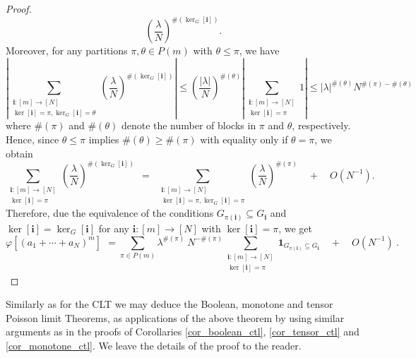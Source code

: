 \documentclass[a4paper,12pt]{extarticle}
\theoremstyle{definition}
\theoremstyle{remark}
\newcommand{\abs}[1]{\left\vert {#1} \right\vert}
\begin{document}
\begin{proof}
\[	\left(\frac{\lambda}{N}\right)^{\# (\ker_G[\bm{i}])} .
	\]
	Moreover, for any partitions $\pi, \theta \in P(m)$ with $\theta \leq \pi$, we have
	\[
	\abs{
		\sum_{\substack{ {\bm i}:[m]\rightarrow [N] \\ \ker[\bm{i}]=\pi, \ker_G[\bm{i}] = \theta}} 
		\left(\frac{\lambda}{N}\right)^{\# (\ker_G[\bm{i}])}}
	\leq 
	\left(
	\frac{ \abs{\lambda} }{N} \right)^{\#(\theta) }
	\abs{
		\sum_{\substack{ {\bm i}:[m]\rightarrow [N] \\ \ker[\bm{i}]=\pi }} 
		1 
	}
	\leq 
	\abs{\lambda}^{\#(\theta)}  N^{\#(\pi) - \#(\theta)}
	\]
	where $\#(\pi)$ and $\#(\theta)$ denote the number of blocks in $\pi$ and $\theta$, respectively. 
	Hence, since $\theta \leq \pi$ implies $\#(\theta) \geq \#(\pi)$ with equality only if $\theta = \pi$, we obtain 
	\[
	\sum_{\substack{ {\bm i}:[m]\rightarrow [N] \\ \ker[{\bm i}]=\pi}}  
	\left(\frac{\lambda}{N}\right)^{\# (\ker_G[\bm{i}])}
	\ \ = \ \ 
	\sum_{\substack{ {\bm i}:[m]\rightarrow [N] \\ \ker[\bm{i}]=\pi, \ker_G[\bm{i}] = \pi}} 
	\left(\frac{\lambda}{N}\right)^{\# (\pi)} 
	\quad + \quad O(N^{-1}) .
	\]
	Therefore, due the equivalence of the conditions $G_{\pi(\bm{i})}  \subseteq G_{\bm i}$ and $\ker[\bm{i}]= \ker_G[\bm{i}] $ for any ${\bm i}:[m]\rightarrow [N]$ with $\ker[{\bm i}]=\pi$, we get 
	\[ \varphi\left[ \left( a_1+\cdots+a_N  \right)_{}^m\right]
	\ \, =
	\sum_{\pi \in P(m)}  
	\lambda^{\#(\pi)}  \ N^{-\#(\pi)}
	\sum_{\substack{ {\bm i}:[m]\rightarrow [N] \\ \ker[{\bm i}]=\pi}}  
	\bm{1}_{G_{\pi(\bm{i})}  \subseteq G_{\bm i}}  
	\quad	+ \quad O(N^{-1}) \ .
	\]
\end{proof}



Similarly as for the CLT we may deduce the Boolean, monotone and tensor Poisson limit Theorems, as applications of the above theorem by using similar arguments as in the proofs of Corollaries \ref{cor_boolean_ctl}, \ref{cor_tensor_ctl}  and  \ref{cor_monotone_ctl}.
We leave the details of the proof to the reader. 
\end{document}
